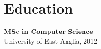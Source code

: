 \documentclass[a4paper,10pt]{article}
\begin{document}
{\begin{minipage}[t]{0.32\textwidth}
{\begin{minipage}[t][\textheight]{\dimexpr\textwidth-10pt}
        \section*{\color{lightblue} Education}
        \textbf{MSc in Computer Science} \\
        University of East Anglia, 2012
        \vfill %
    \end{minipage}%
    }
\end{minipage}%
\vfill %
}%
\end{document}
